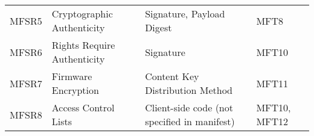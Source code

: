 \documentclass[0-thesis.tex]{subfiles}
\begin{document}
\begin{longtable}[]{@{}llll@{}}
\begin{minipage}[t]{0.16\columnwidth}
    MFSR5\strut
    \end{minipage} & \begin{minipage}[t]{0.29\columnwidth}\raggedright\strut
    Cryptographic Authenticity\strut
    \end{minipage} & \begin{minipage}[t]{0.34\columnwidth}\raggedright\strut
    Signature, Payload Digest\strut
    \end{minipage} & \begin{minipage}[t]{0.10\columnwidth}\raggedright\strut
    MFT8\strut
    \end{minipage}\tabularnewline
    \begin{minipage}[t]{0.16\columnwidth}\raggedright\strut
    MFSR6\strut
    \end{minipage} & \begin{minipage}[t]{0.29\columnwidth}\raggedright\strut
    Rights Require Authenticity\strut
    \end{minipage} & \begin{minipage}[t]{0.34\columnwidth}\raggedright\strut
    Signature\strut
    \end{minipage} & \begin{minipage}[t]{0.10\columnwidth}\raggedright\strut
    MFT10\strut
    \end{minipage}\tabularnewline
    \begin{minipage}[t]{0.16\columnwidth}\raggedright\strut
    MFSR7\strut
    \end{minipage} & \begin{minipage}[t]{0.29\columnwidth}\raggedright\strut
    Firmware Encryption\strut
    \end{minipage} & \begin{minipage}[t]{0.34\columnwidth}\raggedright\strut
    Content Key Distribution Method\strut
    \end{minipage} & \begin{minipage}[t]{0.10\columnwidth}\raggedright\strut
    MFT11\strut
    \end{minipage}\tabularnewline
    \begin{minipage}[t]{0.16\columnwidth}\raggedright\strut
    MFSR8\strut
    \end{minipage} & \begin{minipage}[t]{0.29\columnwidth}\raggedright\strut
    Access Control Lists\strut
    \end{minipage} & \begin{minipage}[t]{0.34\columnwidth}\raggedright\strut
    Client-side code (not specified in manifest)\strut
    \end{minipage} & \begin{minipage}[t]{0.10\columnwidth}\raggedright\strut
    MFT10, MFT12\strut
    \end{minipage}\tabularnewline
    \bottomrule
\end{longtable}
\end{document}
